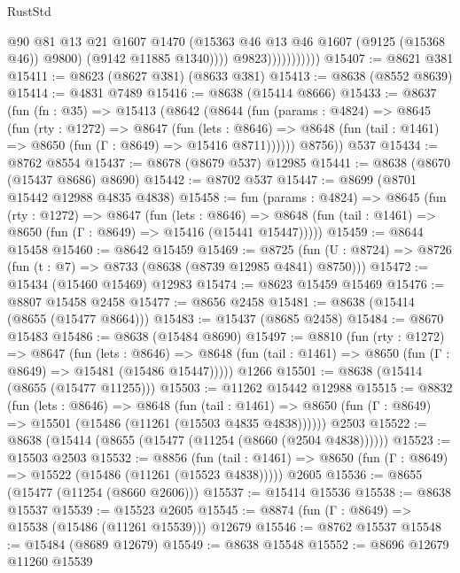 \begin{lexlean}{RustStd}
\begin{coremodule}
                                @90
                                @81
                                @13
                                @21
                                @1607
                                @1470
                                (@15363 @46 @13 @46 @1607 (@9125 (@15368 @46)) @9800)
                                (@9142 @11885 @1340))))
                          @9823)))))))))))
@15407 := @8621 @381
@15411 := @8623 (@8627 @381) (@8633 @381)
@15413 := @8638 (@8552 @8639)
@15414 := @4831 @7489
@15416 := @8638 (@15414 @8666)
@15433 := @8637
    (fun (fn : @35) =>
    @15413
      (@8642
        (@8644
          (fun (params : @4824) =>
          @8645
            (fun (rty : @1272) =>
            @8647
              (fun (lets : @8646) =>
              @8648 (fun (tail : @1461) => @8650 (fun (Γ : @8649) => @15416 @8711))))))
        @8756))
    @537
@15434 := @8762 @8554
@15437 := @8678 (@8679 @537) @12985
@15441 := @8638 (@8670 (@15437 @8686) @8690)
@15442 := @8702 @537
@15447 := @8699 (@8701 @15442 @12988 @4835 @4838)
@15458 := fun (params : @4824) =>
  @8645
    (fun (rty : @1272) =>
    @8647
      (fun (lets : @8646) =>
      @8648 (fun (tail : @1461) => @8650 (fun (Γ : @8649) => @15416 (@15441 @15447)))))
@15459 := @8644 @15458
@15460 := @8642 @15459
@15469 := @8725
    (fun (U : @8724) => @8726 (fun (t : @7) => @8733 (@8638 (@8739 @12985 @4841) @8750)))
@15472 := @15434 (@15460 @15469) @12983
@15474 := @8623 @15459 @15469
@15476 := @8807 @15458 @2458
@15477 := @8656 @2458
@15481 := @8638 (@15414 (@8655 (@15477 @8664)))
@15483 := @15437 (@8685 @2458)
@15484 := @8670 @15483
@15486 := @8638 (@15484 @8690)
@15497 := @8810
    (fun (rty : @1272) =>
    @8647
      (fun (lets : @8646) =>
      @8648 (fun (tail : @1461) => @8650 (fun (Γ : @8649) => @15481 (@15486 @15447)))))
    @1266
@15501 := @8638 (@15414 (@8655 (@15477 @11255)))
@15503 := @11262 @15442 @12988
@15515 := @8832
    (fun (lets : @8646) =>
    @8648
      (fun (tail : @1461) =>
      @8650 (fun (Γ : @8649) => @15501 (@15486 (@11261 (@15503 @4835 @4838))))))
    @2503
@15522 := @8638 (@15414 (@8655 (@15477 (@11254 (@8660 (@2504 @4838))))))
@15523 := @15503 @2503
@15532 := @8856
    (fun (tail : @1461) => @8650 (fun (Γ : @8649) => @15522 (@15486 (@11261 (@15523 @4838)))))
    @2605
@15536 := @8655 (@15477 (@11254 (@8660 @2606)))
@15537 := @15414 @15536
@15538 := @8638 @15537
@15539 := @15523 @2605
@15545 := @8874 (fun (Γ : @8649) => @15538 (@15486 (@11261 @15539))) @12679
@15546 := @8762 @15537
@15548 := @15484 (@8689 @12679)
@15549 := @8638 @15548
@15552 := @8696 @12679 @11260 @15539

\end{coremodule}
\end{lexlean}
